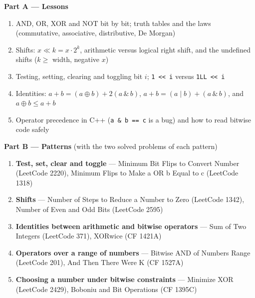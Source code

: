 \begin{plannedbox}
\textbf{Part A --- Lessons}
\begin{enumerate}[leftmargin=*, label=\textbf{A\arabic*.}, itemsep=1pt]
    \item AND, OR, XOR and NOT bit by bit; truth tables and the laws (commutative, associative, distributive, De Morgan)
    \item Shifts: $x \ll k = x\cdot 2^k$, arithmetic versus logical right shift, and the undefined shifts ($k \ge$ width, negative $x$)
    \item Testing, setting, clearing and toggling bit $i$; \texttt{1 << i} versus \texttt{1LL << i}
    \item Identities: $a + b = (a \oplus b) + 2(a \,\&\, b)$, $a + b = (a \mid b) + (a \,\&\, b)$, and $a \oplus b \le a + b$
    \item Operator precedence in C++ (\texttt{a \& b == c} is a bug) and how to read bitwise code safely
\end{enumerate}
\textbf{Part B --- Patterns} (with the two solved problems of each pattern)
\begin{enumerate}[leftmargin=*, label=\textbf{P\arabic*.}, itemsep=1pt]
    \item \textbf{Test, set, clear and toggle} --- Minimum Bit Flips to Convert Number {\small\color{darkgray}(LeetCode 2220)}, Minimum Flips to Make a OR b Equal to c {\small\color{darkgray}(LeetCode 1318)}
    \item \textbf{Shifts} --- Number of Steps to Reduce a Number to Zero {\small\color{darkgray}(LeetCode 1342)}, Number of Even and Odd Bits {\small\color{darkgray}(LeetCode 2595)}
    \item \textbf{Identities between arithmetic and bitwise operators} --- Sum of Two Integers {\small\color{darkgray}(LeetCode 371)}, XORwice {\small\color{darkgray}(CF 1421A)}
    \item \textbf{Operators over a range of numbers} --- Bitwise AND of Numbers Range {\small\color{darkgray}(LeetCode 201)}, And Then There Were K {\small\color{darkgray}(CF 1527A)}
    \item \textbf{Choosing a number under bitwise constraints} --- Minimize XOR {\small\color{darkgray}(LeetCode 2429)}, Boboniu and Bit Operations {\small\color{darkgray}(CF 1395C)}
\end{enumerate}
\end{plannedbox}
